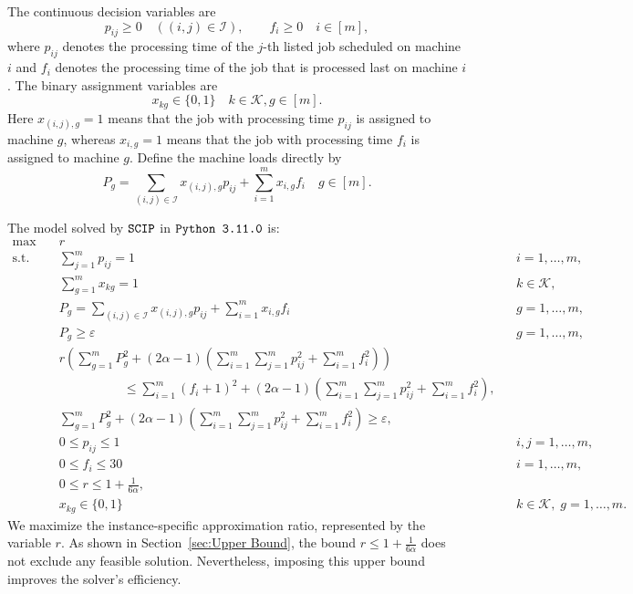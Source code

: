 \documentclass[%
english, titlepage=false %
]{./tum-templates/book/tumbook}
\begin{document}
The continuous decision variables are
\[
  p_{ij}\ge 0\quad ((i,j)\in \mathcal{I}),\qquad
  f_i\ge 0\quad i \in [m],
\]
where \(p_{ij}\) denotes the processing time of the \(j\)-th listed job scheduled on
machine \(i\) and $f_i$ denotes the processing time of the job that is processed last on machine \(i\).
The binary assignment variables are
\[
  x_{kg}\in\{0,1\}\quad k\in \mathcal{K}, g\in [m].
\]
Here \(x_{(i,j),g}=1\) means that the job with processing time \(p_{ij}\) is assigned to machine \(g\),
whereas \(x_{i,g}=1\) means that the job with processing time \(f_i\) is assigned to machine \(g\).
Define the machine loads directly by
\[
  P_g
  =\sum_{(i,j)\in\mathcal{I}}x_{(i,j),g}p_{ij}
  +\sum_{i=1}^m x_{i,g}f_i
  \quad g\in [m].
\]



The model solved by $\verb|SCIP|$ in $\verb|Python 3.11.0|$ is:
\[
\boxed{
\begin{aligned}
\max\quad
  & r \\[0.4em]
\text{s.t.}\quad
  & \sum_{j=1}^m p_{ij}=1
      && i=1,\ldots,m,\\[0.4em]
  & \sum_{g=1}^m x_{kg}=1
      && k\in \mathcal{K},\\[0.4em]
  & P_g=\sum_{(i,j)\in\mathcal{I}}x_{(i,j),g}p_{ij}
      +\sum_{i=1}^m x_{i,g}f_i
      && g=1,\ldots,m,\\[0.4em]
  & P_g\ge \varepsilon
      && g=1,\ldots,m,\\[0.4em]
  & r\left(
      \sum_{g=1}^m P_g^2
      +(2\alpha-1)\left(\sum_{i=1}^m\sum_{j=1}^m p_{ij}^2
      +\sum_{i=1}^m f_i^2\right)
    \right)\\
  &\hspace{5em}\le
    \sum_{i=1}^m(f_i+1)^2
    +(2\alpha-1)\left(\sum_{i=1}^m\sum_{j=1}^m p_{ij}^2
    +\sum_{i=1}^m f_i^2\right),\\[0.4em]
  & \sum_{g=1}^m P_g^2
      +(2\alpha-1)\left(\sum_{i=1}^m\sum_{j=1}^m p_{ij}^2
      +\sum_{i=1}^m f_i^2\right)
      \ge \varepsilon,\\[0.4em]
  & 0\le p_{ij}\le 1
      && i,j=1,\ldots,m,\\[0.4em]
  & 0\le f_i\le 30
      && i=1,\ldots,m,\\[0.4em]
  & 0\le r\le 1+\frac{1}{6\alpha},\\[0.4em]
  & x_{kg}\in\{0,1\}
      && k\in \mathcal{K},\;g=1,\ldots,m.
\end{aligned}
}
\]
We maximize the instance-specific approximation ratio, represented by the
variable \(r\). As shown in Section~\ref{sec:Upper Bound}, the bound
$r \leq 1 + \frac{1}{6\alpha}$
does not exclude any feasible solution. Nevertheless, imposing this upper
bound improves the solver's efficiency.
\end{document}

